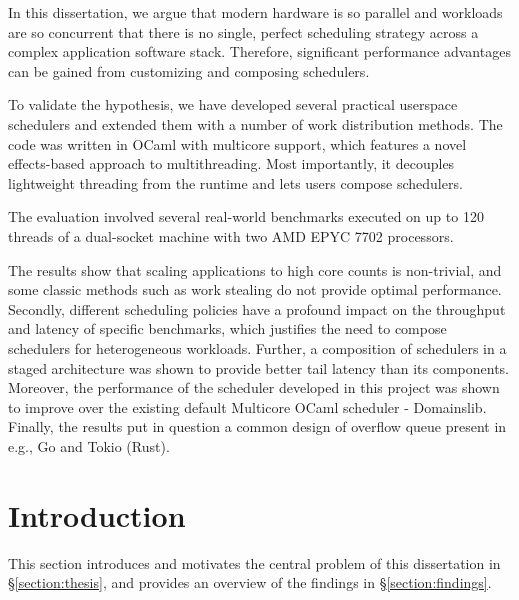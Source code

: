 \documentclass[12pt,a4paper,twoside]{report}
\begin{document}
In this dissertation, we argue that modern hardware is so parallel and workloads are so concurrent that there is no single, perfect scheduling strategy across a complex application software stack. Therefore, significant performance advantages can be gained from customizing and composing schedulers.

To validate the hypothesis, we have developed several practical userspace schedulers and extended them with a number of work distribution methods. The code was written in OCaml with multicore support, which features a novel effects-based approach to multithreading. Most importantly, it decouples lightweight threading from the runtime and lets users compose schedulers. 

The evaluation involved several real-world benchmarks executed on up to 120 threads of a dual-socket machine with two AMD EPYC 7702 processors.

The results show that scaling applications to high core counts is non-trivial, and some classic methods such as work stealing do not provide optimal performance. Secondly, different scheduling policies have a profound impact on the throughput and latency of specific benchmarks, which justifies the need to compose schedulers for heterogeneous workloads. Further, a composition of schedulers in a staged architecture was shown to provide better tail latency than its components. Moreover, the performance of the scheduler developed in this project was shown to improve over the existing default Multicore OCaml scheduler - Domainslib. Finally, the results put in question a common design of overflow queue present in e.g., Go and Tokio (Rust).

\tableofcontents

\chapter{Introduction}

\label{firstcontentpage} %

\label{section:introduction}
This section introduces and motivates the central problem of this dissertation in \S\ref{section:thesis}, and provides an overview of the findings in \S\ref{section:findings}.  
\end{document}
